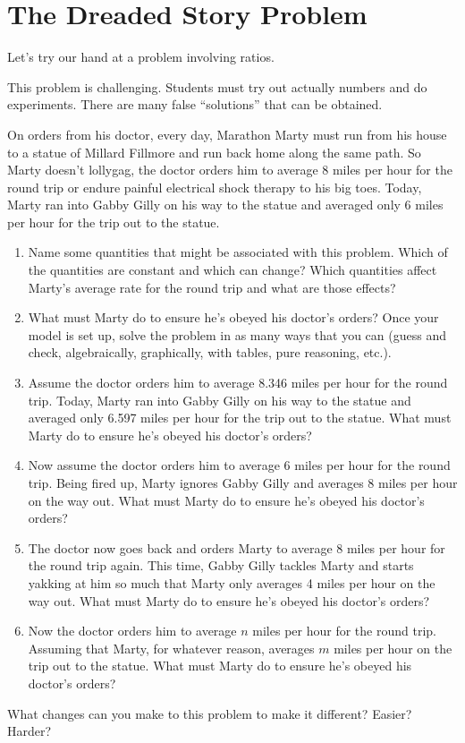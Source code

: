 \newpage
\section{The Dreaded Story Problem}\label{A:dreadedStoryProblem}

Let's try our hand at a problem involving ratios.

\begin{teachingnote}
This problem is challenging. Students must try out actually
numbers and do experiments. There are many false ``solutions'' that can be obtained.
\end{teachingnote}


\begin{prob}
On orders from his doctor, every day, Marathon Marty must run from his
house to a statue of Millard Fillmore and run back home along the same
path.  So Marty doesn't lollygag, the doctor orders him to average 8
miles per hour for the round trip or endure painful electrical shock
therapy to his big toes.  Today, Marty ran into Gabby Gilly on his way
to the statue and averaged only 6 miles per hour for the trip out to
the statue.
\begin{enumerate}
\item Name some quantities that might be associated with this problem.
Which of the quantities are constant and which can change? Which
quantities affect Marty's average rate for the round trip and what are
those effects?

\item What must Marty do to ensure he's obeyed his doctor's orders? 
Once your model is set up, solve the problem in as many ways that you
can (guess and check, algebraically, graphically, with tables, pure
reasoning, etc.).

\item Assume the doctor orders him to average 8.346 miles per hour for the round trip.
Today, Marty ran into Gabby Gilly on his way to the statue and
averaged only 6.597 miles per hour for the trip out to the statue.
What must Marty do to ensure he's obeyed his doctor's orders?
\item Now assume the doctor orders him to average 6 miles per hour for the round trip.
Being fired up, Marty ignores Gabby Gilly and averages 8 miles per
hour on the way out.  What must Marty do to ensure he's obeyed his
doctor's orders?
\item The doctor now goes back and orders Marty to average 8 miles per hour for the round trip again.
This time, Gabby Gilly tackles Marty and starts yakking at him so much
that Marty only averages 4 miles per hour on the way out.  What must
Marty do to ensure he's obeyed his doctor's orders?
\item Now the doctor orders him to average $n$ miles per hour for the round trip.
Assuming that Marty, for whatever reason, averages $m$ miles per hour on
the trip out to the statue. What must Marty do to ensure he's obeyed
his doctor's orders?
\end{enumerate}
\end{prob}

\begin{prob}
What changes can you make to this problem to make it different?
Easier? Harder?
\end{prob}
